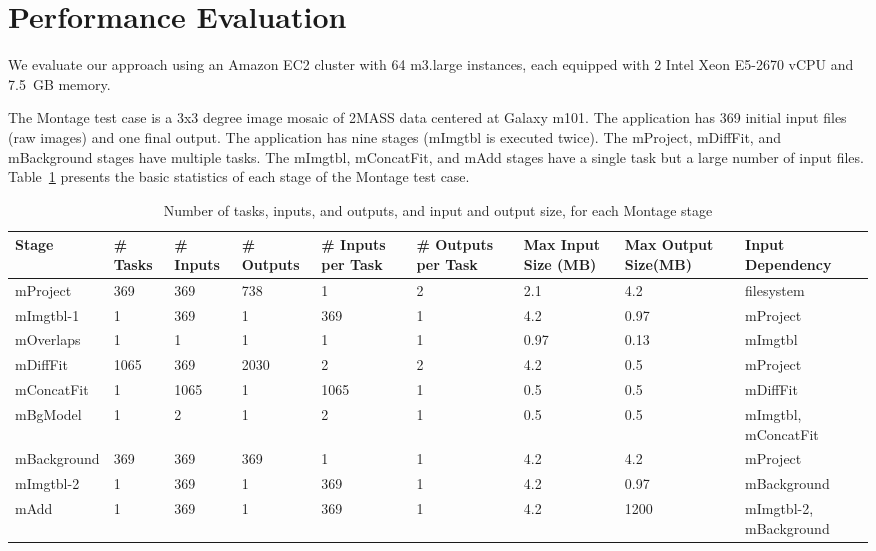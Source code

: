 \documentclass{sig-alternate}
\begin{document}
\section{Performance Evaluation}
\label{sec:Perf}
We evaluate our approach using an Amazon EC2 cluster with 64 m3.large instances, each
equipped with 2 Intel Xeon E5-2670 vCPU and 7.5~GB memory. 

The Montage test case is a 3x3 degree image mosaic of 2MASS data centered at Galaxy m101. 
The application has 369 initial input files (raw images) and one final output. 
The application has nine stages (mImgtbl is executed twice). 
The mProject, mDiffFit, and mBackground stages have multiple tasks. 
The mImgtbl, mConcatFit, and mAdd stages have a single task but a large number of input files. 
Table~\ref{tb:montage-stats} presents the basic statistics of each stage of the Montage test case.



\begin{table}[ht]
\begin{center}
    \caption{Number of tasks, inputs, and outputs, and input and output size, for each Montage stage}
    \begin{scriptsize}
    \begin{tabular}{ | p{1.6cm} | p{0.8cm} | p{0.8cm} | p{1.2cm} | p{1cm} | p{1.1cm} | p{1.1cm} | p{1.2cm} | p{2.7cm} |}
    \hline
    Stage & \# Tasks & \# Inputs & \# Outputs & \# Inputs per Task & \# Outputs per Task & Max Input Size (MB) & Max Output Size(MB) & Input Dependency\\ \hline \hline
	mProject & 369 & 369 & 738 & 1 & 2 & 2.1 & 4.2 & filesystem \\ \hline
	mImgtbl-1 & 1 & 369 & 1 & 369 & 1 & 4.2 & 0.97 & mProject\\ \hline
	mOverlaps & 1 & 1 & 1 & 1 & 1 & 0.97 & 0.13 & mImgtbl\\ \hline
	mDiffFit & 1065 & 369 & 2030 & 2 & 2 & 4.2 & 0.5 & mProject\\ \hline
	mConcatFit & 1 & 1065 & 1 & 1065 & 1 & 0.5 & 0.5 & mDiffFit\\ \hline
	mBgModel & 1 & 2 & 1 & 2 & 1 & 0.5 & 0.5 & mImgtbl, mConcatFit\\ \hline
	mBackground & 369 & 369 & 369 & 1 & 1 & 4.2 & 4.2 & mProject\\ \hline
	mImgtbl-2 & 1 & 369 & 1 & 369 & 1 & 4.2 & 0.97 & mBackground\\ \hline
	mAdd  & 1 & 369 & 1 & 369 & 1 & 4.2 & 1200 & mImgtbl-2, mBackground\\ \hline
    \end{tabular}
    \end{scriptsize}
    \label{tb:montage-stats}
\end{center}   
\end{table} 
\end{document}
